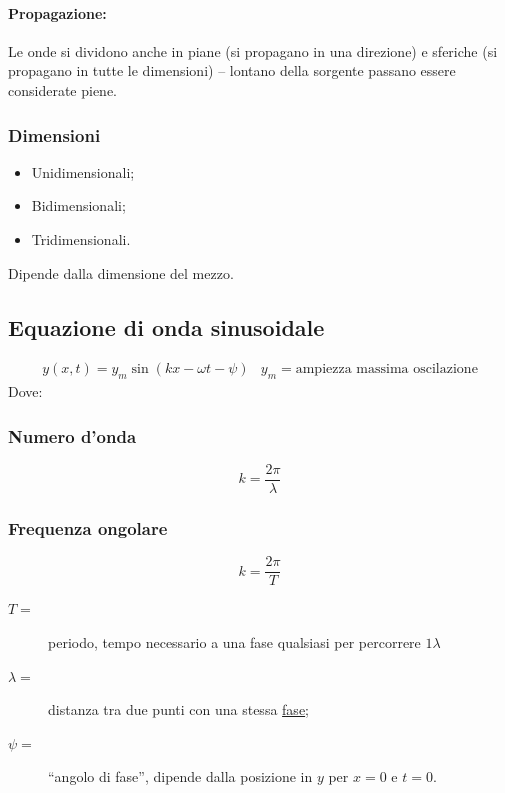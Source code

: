 \documentclass{book}
\begin{document}
\paragraph{Propagazione:}
Le onde si dividono anche in piane (si propagano in una direzione) e sferiche (si propagano in tutte le dimensioni) -- lontano della sorgente passano essere considerate piene.

\subsubsection{Dimensioni}
\label{sec:ondim}
\begin{itemize}
\item Unidimensionali;
\item Bidimensionali;
\item Tridimensionali.
\end{itemize}
Dipende dalla dimensione del mezzo.

\subsection{Equazione di onda sinusoidale}
\label{sec:eqsin}
\begin{eqnarray}
  \label{eq:eqsin}
  y(x,t)=y_m\sin(kx-\omega t -\psi) & y_m=\text{ampiezza massima oscilazione}
\end{eqnarray}
Dove:
\begin{multicols}{2}
  \subsubsection{Numero d'onda}
  \label{sec:nonda}
  
  \begin{equation}
    \label{eq:nonda}
    k=\frac{2\pi}{\lambda}
  \end{equation}
  
  \subsubsection{Frequenza ongolare}
  \label{sec:fdonda}
  \begin{equation}
    \label{eq:fdonda}
    k=\frac{2\pi}{T}
  \end{equation}  
\end{multicols}
\begin{description}
\item[$T=$] periodo, tempo necessario a una fase qualsiasi per percorrere $1\lambda$
\item[$\lambda=$] distanza tra due punti con una stessa \underline{fase};
\item[$\psi=$] ``angolo di fase'', dipende dalla posizione in $y$ per $x=0$ e $t=0$.
\end{description}
\end{document}
